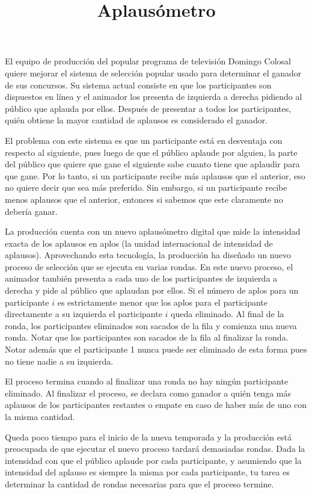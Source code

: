 \documentclass{oci}
\title{Aplausómetro}
\begin{document}
\begin{problemDescription}
El equipo de producción del popular programa de televisión
Domingo Colosal quiere mejorar el sistema de selección
popular usado para determinar el ganador de sus concursos.
%
Su sistema actual consiste en que los participantes
son dispuestos en línea y el animador los presenta de
izquierda a derecha pidiendo al público que aplauda por ellos.
%
Después de presentar a todos los participantes, quién obtiene
la mayor cantidad de aplausos es considerado el ganador.

El problema con este sistema es que
un participante está en desventaja con respecto
al siguiente, pues luego de que el público aplaude por
alguien, la parte del público que quiere que gane el siguiente
sabe cuanto tiene que aplaudir para que gane.
%
Por lo tanto, si un participante recibe más aplausos
que el anterior, eso no quiere decir que sea más preferido.
%
Sin embargo, si un participante recibe menos aplausos
que el anterior, entonces si sabemos que este claramente
no debería ganar.

La producción cuenta con un nuevo aplausómetro digital
que mide la intensidad exacta de los aplausos en aplos
(la unidad internacional de intensidad de aplausos).
%
Aprovechando esta tecnología, la producción ha diseñado
un nuevo proceso de selección que se ejecuta en varias rondas.
%
En este nuevo proceso, el animador también presenta a cada uno
de los participantes de izquierda a derecha y pide al público
que aplaudan por ellos.
%
Si el número de aplos para un participante $i$ es estrictamente
menor que los aplos para el participante directamente a
su izquierda el participante $i$ queda eliminado.
%
Al final de la ronda, los participantes eliminados son sacados
de la fila y comienza una nueva ronda.
%
Notar que los participantes son sacados de la fila al finalizar
la ronda.
%
Notar además que el participante 1 nunca puede ser eliminado
de esta forma pues no tiene nadie a su izquierda.

El proceso termina cuando al finalizar una ronda
no hay ningún participante eliminado.
%
%
Al finalizar el proceso, se declara como ganador a quién
tenga más aplausos de los participantes restantes o empate
en caso de haber más de uno con la misma cantidad.

Queda poco tiempo para el inicio de la nueva temporada
y la producción está preocupada de que ejecutar el nuevo proceso
tardará demasiadas rondas.
%
Dada la intensidad con que el público aplaude por cada participante,
y asumiendo que la intensidad del aplauso es siempre la misma por
cada participante, tu tarea es determinar la cantidad de rondas
necesarias para que el proceso termine.
\end{problemDescription}
\end{document}
